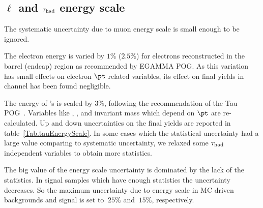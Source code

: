 \subsection{\texorpdfstring{$\ell$ and $\tau_{\rm had}$ energy scale}{Energy scale}}

The systematic uncertainty due to muon energy scale is small enough to be ignored.

The electron energy is varied by $1\%$ ($2.5\%$) for electrons reconstructed in the barrel (endcap) region as recommended by EGAMMA POG\cite{eEnergyScale}. As this variation has small effects on electron $\pt$ related variables, its effect on final yields in \eTau channel has been found negligible.

The energy of \hadtau's is scaled by $3\%$, following the recommendation of the Tau POG~\cite{TauPOG}. Variables like \MET, \mttwo, \mindphifour and invariant mass which depend on \hadtau $\pt$ are re-calculated.  Up and down uncertainties on the final yields are reported in table~\ref{Tab.tauEnergyScale}. In some cases which the statistical uncertainty had a large value comparing to systematic uncertainty, we relaxed some $\tau_{\rm had}$ \pt  independent variables to obtain more statistics.

The big value of the \hadtau energy scale uncertainty is dominated by the lack of the statistics. In signal samples which have enough statistics the uncertainty decreases. So the maximum uncertainty due to \hadtau energy scale in MC driven backgrounds and signal is set to $~25\%$ and $~15\%$, respectively.





